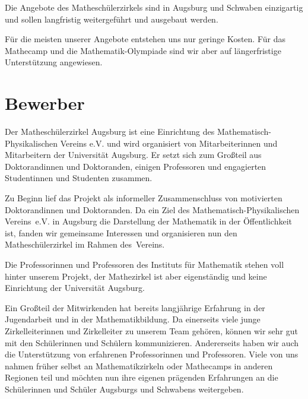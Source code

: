 \documentclass[12pt]{zettel}
\begin{document}
Die Angebote des Matheschülerzirkels sind in Augsburg und Schwaben einzigartig
und sollen langfristig weitergeführt und ausgebaut werden.

Für die meisten unserer Angebote entstehen uns nur geringe Kosten. Für das
Mathecamp und die Mathematik-Olympiade sind wir aber auf längerfristige
Unterstützung angewiesen.


\section{Bewerber}

Der Matheschülerzirkel Augsburg ist eine Einrichtung des
Mathematisch-Phy\-si\-ka\-li\-schen Vereins e.V. und wird organisiert von
Mitarbeiterinnen und Mitarbeitern der Universität
Augsburg. Er setzt sich zum Großteil aus Doktorandinnen und Doktoranden,
einigen Professoren und engagierten Studentinnen und Studenten zusammen.

Zu Beginn lief das Projekt als informeller Zusammenschluss von motivierten Doktorandinnen und Doktoranden. Da ein Ziel des Mathematisch-Physikalischen Vereins~e.V. in Augsburg die Darstellung der Mathematik in der Öffentlichkeit ist, fanden wir gemeinsame Interessen und organisieren nun den Matheschülerzirkel im Rahmen des~Vereins.

Die Professorinnen und Professoren des Instituts für Mathematik stehen voll hinter unserem Projekt, der Mathezirkel ist aber eigenständig und keine Einrichtung der Universität Augsburg.

Ein Großteil der Mitwirkenden hat bereits langjährige Erfahrung in
der Jugendarbeit und in der Mathematikbildung. Da einerseits viele junge Zirkelleiterinnen und Zirkelleiter zu unserem Team gehören, können wir
sehr gut mit den Schülerinnen und Schülern kommunizieren.
Andererseits haben wir auch die Unterstützung von erfahrenen Professorinnen und
Professoren. Viele von uns nahmen früher selbst an Mathematikzirkeln oder
Mathecamps in anderen Regionen teil und möchten nun ihre eigenen prägenden Erfahrungen an die Schülerinnen und Schüler Augsburgs und Schwabens weitergeben.
\end{document}
